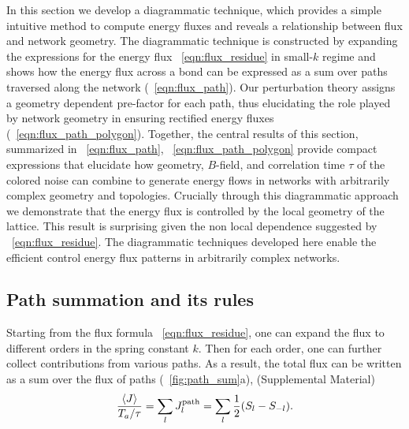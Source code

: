 \documentclass[
 preprint,
 preprintnumbers,
 amsmath,amssymb,
 aps,
 pre,
 longbibliography,
 superscriptaddress,
 10pt, twocolumn
]{revtex4-1}
\begin{document}
In this section we develop a diagrammatic technique, which provides a simple intuitive method to compute energy fluxes and reveals a relationship between flux and network geometry.
The diagrammatic technique is constructed by expanding the expressions for the energy flux \eqnname~\eqref{eqn:flux_residue} in small-$k$ regime and shows how the energy flux across a bond can be expressed as a sum over paths traversed along the network (\eqnname~\eqref{eqn:flux_path}). Our perturbation theory assigns a geometry dependent pre-factor for each path, thus elucidating the role played by network geometry in ensuring rectified energy fluxes (\eqnname~\eqref{eqn:flux_path_polygon}). Together, the central results of this section, summarized in  \eqnname~\ref{eqn:flux_path}, \eqnname~\ref{eqn:flux_path_polygon} provide compact expressions that elucidate how geometry, $B$-field, and correlation time $\tau$ of the colored noise can combine to generate energy flows in networks with arbitrarily complex geometry and topologies. Crucially through this diagrammatic approach we demonstrate that the energy flux is controlled by the local geometry of the lattice. This result is surprising given the non local dependence suggested by \eqnname~\ref{eqn:flux_residue}. The diagrammatic techniques developed here enable the efficient control energy flux patterns in arbitrarily complex networks. 


\subsection{Path summation and its rules}
Starting from the flux formula \eqnname~\eqref{eqn:flux_residue}, one can expand the flux to different orders in the spring constant $k$. Then for each order, one can further collect contributions from various paths.
As a result, the total flux can be written as a sum over the flux of paths (\figurename~\ref{fig:path_sum}a), (Supplemental Material)
\begin{equation} \label{eqn:flux_path}
    \frac{\expval{J}}{T_a/\tau} = \sum_l J^\text{path}_l = \sum_l \frac{1}{2}(S_l - S_{-l}).
\end{equation}
\end{document}
